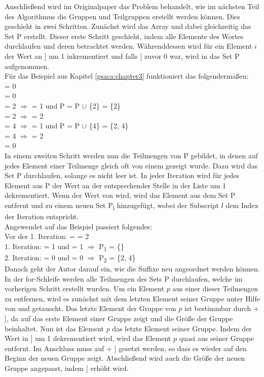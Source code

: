 Anschließend wird im Originalpaper das Problem behandelt, wie im nächsten Teil des Algorithmus die Gruppen und Teilgruppen erstellt werden können. 
Dies geschieht in zwei Schritten. 
Zunächst wird das Array \pc und dabei gleichzeitig das Set P erstellt. 
Dieser erste Schritt geschieht, indem alle Elemente des Wortes durchlaufen und deren \prevpointer betrachtet werden. 
Währenddessen wird für ein Element $i$ der Wert an \pc[\prev[$i$]] um 1 inkrementiert und falls \pc[\prev[$i$]] zuvor 0 war, wird \prev[$i$] in das Set P aufgenommen.\\
Für das Beispiel aus Kapitel \ref{gsaca:chapter3} funktioniert das folgendermaßen:\\
\prev[1] = 0\\
\prev[2] = 0\\
\prev[3] = 2 $\Rightarrow$ \pc[2] = 1 und P = P $\cup$ \{2\} = \{2\}\\
\prev[4] = 2 $\Rightarrow$ \pc[2] = 2\\
\prev[5] = 4 $\Rightarrow$ \pc[4] = 1 und P = P $\cup$ \{4\} = \{2, 4\}\\
\prev[6] = 4 $\Rightarrow$ \pc[4] = 2\\
\prev[7] = 0\\
In einem zweiten Schritt werden nun die Teilmengen von P gebildet, in denen auf jedes Element einer Teilmenge gleich oft von einem \prevpointer gezeigt wurde. 
Dazu wird das Set P durchlaufen, solange es nicht leer ist. 
In jeder Iteration wird für jedes Element aus P der Wert an der entsprechender Stelle in der Liste \pc um 1 dekrementiert. 
Wenn der Wert von  wird, wird das Element aus dem Set P entfernt und zu einem neuen Set P\textsubscript{l} hinzugefügt, wobei der Subscript $l$ dem Index der Iteration entspricht. \\
Angewendet auf das Beispiel passiert folgendes:\\
Vor der 1. Iteration: \pc[2] = \pc[4] = 2\\
1. Iteration: \pc[2] = 1 und \pc[4] = 1 $\Rightarrow$ P\textsubscript{1} = \{\} \\
2. Iteration: \pc[2] = 0 und \pc[4] = 0 $\Rightarrow$ P\textsubscript{2} = \{2, 4\}\\

Danach geht der Autor darauf ein, wie die Suffixe neu angeordnet werden können. 
In der for-Schleife werden alle Teilmengen des Sets P durchlaufen, welche im vorherigen Schritt erstellt wurden. 
Um ein Element $p$ aus einer dieser Teilmengen zu entfernen, wird es zunächst mit dem letzten Element seiner Gruppe unter Hilfe von \sa und \isa getauscht. 
Das letzte Element der Gruppe von $p$ ist bestimmbar durch \glink[$p$] + \gsize[\glink[$p$]], da \glink auf das erste Element einer Gruppe zeigt und \gsize die Größe der Gruppe beinhaltet. 
Nun ist das Element $p$ das letzte Element seiner Gruppe. 
Indem der Wert in \gsize[\glink[$p$]] um 1 dekrementiert wird, wird das Element $p$ quasi aus seiner Gruppe entfernt. 
Im Anschluss muss \glink[$p$] auf \glink[$p$] + \gsize[\glink[$p$]] gesetzt werden, so dass es wieder auf den Beginn der neuen Gruppe zeigt. 
Abschließend wird auch die Größe der neuen Gruppe angepasst, indem \gsize[\glink[$p$]] erhöht wird.\\


